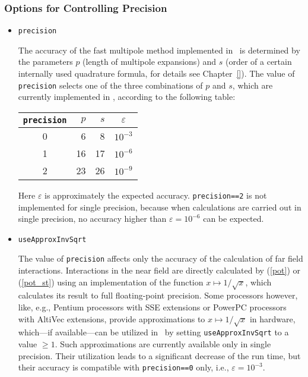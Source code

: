 \subsubsection*{Options for Controlling Precision}
\begin{itemize}
   \item\verb|precision|

The accuracy of %
the fast multipole method
implemented in \fmmv\ is determined by the parameters $p$
(length of multipole expansions) and $s$ (order of a certain internally
used quadrature formula, for details see Chapter~\ref{}).
The value of \verb|precision| selects
one of the three combinations of $p$ and $s$,
which are currently implemented in \fmmv,
according to the following table:
\begin{center}\begin{tabular}{c|rrc}
\verb|precision| &\quad $p$ & $s$ & $\varepsilon$ \\
\hline
0 &  6 & 8 & $10^{-3}$ \\ 
1 & 16 & 17 & $10^{-6}$ \\ 
2 & 23 & 26 & $10^{-9}$  
\end{tabular}\end{center}
Here $\varepsilon$ is approximately the expected accuracy. 
\verb|precision==2| is not implemented
for single precision, because 
when calculations are carried out in
single precision, no accuracy higher than $\varepsilon=10^{-6}$ can be expected.

   \item\verb|useApproxInvSqrt|

The value of \verb|precision| affects only the accuracy of the
calculation of far field interactions. 
Interactions in the near field are directly calculated by (\ref{pot}) 
or (\ref{pot_st}) using an implementation
of the function $x\mapsto1/\sqrt{x}$, which calculates
its result to full floating-point precision.
Some processors however, like,  e.g., Pentium processors with SSE extensions or 
PowerPC processors with AltiVec extensions, provide approximations
to $x\mapsto1/\sqrt{x}$ in hardware, 
which---if available---can be utilized in \fmmv\ by setting
\verb|useApproxInvSqrt| to a value $\geq 1$. 
Such approximations  %
are currently available only in single precision.
Their utilization leads to a significant decrease of the run time,
but their accuracy is compatible with \verb|precision==0| only, i.e.,
$\varepsilon=10^{-3}$.
\end{itemize}
 

